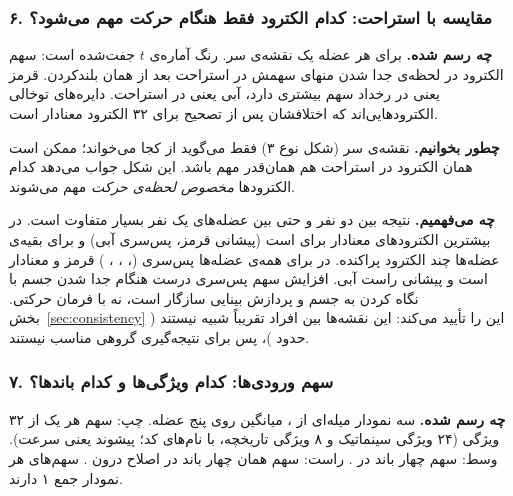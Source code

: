 
\subsubsection*{۶. مقایسه با استراحت: کدام الکترود فقط هنگام حرکت مهم می‌شود؟}

\textbf{چه رسم شده.} برای هر عضله یک نقشه‌ی سر. رنگ آماره‌ی $t$ جفت‌شده است: سهم الکترود در لحظه‌ی جدا شدن منهای سهمش در استراحت بعد از همان بلندکردن. قرمز یعنی در رخداد سهم بیشتری دارد، آبی یعنی در استراحت. دایره‌های توخالی الکترودهایی‌اند که اختلافشان پس از تصحیح برای ۳۲ الکترود معنادار است.

\textbf{چطور بخوانیم.} نقشه‌ی سر (شکل نوع ۳) فقط می‌گوید  از کجا می‌خواند؛ ممکن است همان الکترود در استراحت هم همان‌قدر مهم باشد. این شکل جواب می‌دهد کدام الکترودها \emph{مخصوص لحظه‌ی حرکت} مهم می‌شوند.

\textbf{چه می‌فهمیم.} نتیجه بین دو نفر و حتی بین عضله‌های یک نفر بسیار متفاوت است. در  بیشترین الکترودهای معنادار برای  است (پیشانی قرمز، پس‌سری آبی) و برای بقیه‌ی عضله‌ها چند الکترود پراکنده. در  برای همه‌ی عضله‌ها پس‌سری (، ، ، ) قرمز و معنادار است و پیشانی راست آبی. افزایش سهم پس‌سری درست هنگام جدا شدن جسم با نگاه کردن به جسم و پردازش بینایی سازگار است، نه با فرمان حرکتی. بخش~\ref{sec:consistency} این را تأیید می‌کند: این نقشه‌ها بین افراد تقریباً شبیه نیستند ( حدود )، پس برای نتیجه‌گیری گروهی مناسب نیستند.


\subsubsection*{۷. سهم ورودی‌ها: کدام ویژگی‌ها و کدام باندها؟}

\textbf{چه رسم شده.} سه نمودار میله‌ای از ، میانگین روی پنج عضله. چپ: سهم هر یک از ۳۲ ویژگی  (۲۴ ویژگی سینماتیک و ۸ ویژگی تاریخچه، با نام‌های کد؛ پیشوند  یعنی سرعت). وسط: سهم چهار باند  در . راست: سهم همان چهار باند در اصلاح  درون . سهم‌های هر نمودار جمع ۱ دارند.


